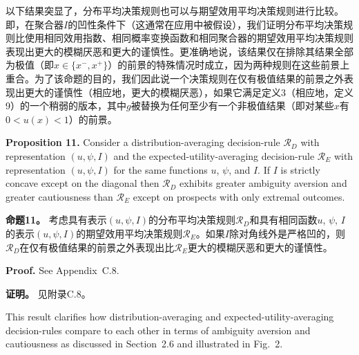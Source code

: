 \documentclass[12pt,a4paper]{article}
\newenvironment{original}
  {\par\noindent\ignorespaces}
  {\par}
\newenvironment{translation}
  {\par\noindent{\color{transblue}\ignorespaces}}
  {\par\medskip}
\begin{document}
\begin{translation}
以下结果突显了，分布平均决策规则也可以与期望效用平均决策规则进行比较。即，在聚合器$I$的凹性条件下（这通常在应用中被假设），我们证明分布平均决策规则比使用相同效用指数、相同概率变换函数和相同聚合器的期望效用平均决策规则表现出更大的模糊厌恶和更大的谨慎性。更准确地说，该结果仅在排除其结果全部为极值（即$x \in \{x^{-}, x^{+}\}$）的前景的特殊情况时成立，因为两种规则在这些前景上重合。为了该命题的目的，我们因此说一个决策规则在仅有极值结果的前景之外表现出更大的谨慎性（相应地，更大的模糊厌恶），如果它满足定义3（相应地，定义9）的一个稍弱的版本，其中$g$被替换为任何至少有一个非极值结果（即对某些$x$有$0 < u(x) < 1$）的前景。
\end{translation}

\begin{original}
\textbf{Proposition 11.} Consider a distribution-averaging decision-rule $\mathcal{R}_{D}$ with representation $(u, \psi, I)$ and the expected-utility-averaging decision-rule $\mathcal{R}_{E}$ with representation $(u, \psi, I)$ for the same functions $u$, $\psi$, and $I$. If $I$ is strictly concave except on the diagonal then $\mathcal{R}_{D}$ exhibits greater ambiguity aversion and greater cautiousness than $\mathcal{R}_{E}$ except on prospects with only extremal outcomes.
\end{original}

\begin{translation}
\textbf{命题11。} 考虑具有表示$(u, \psi, I)$的分布平均决策规则$\mathcal{R}_{D}$和具有相同函数$u$, $\psi$, $I$的表示$(u, \psi, I)$的期望效用平均决策规则$\mathcal{R}_{E}$。如果$I$除对角线外是严格凹的，则$\mathcal{R}_{D}$在仅有极值结果的前景之外表现出比$\mathcal{R}_{E}$更大的模糊厌恶和更大的谨慎性。
\end{translation}

\begin{original}
\textbf{Proof.} See Appendix~C.8.
\end{original}

\begin{translation}
\textbf{证明。} 见附录C.8。
\end{translation}

\begin{original}
This result clarifies how distribution-averaging and expected-utility-averaging decision-rules compare to each other in terms of ambiguity aversion and cautiousness as discussed in Section~2.6 and illustrated in Fig.\ 2.
\end{original}
\end{document}
